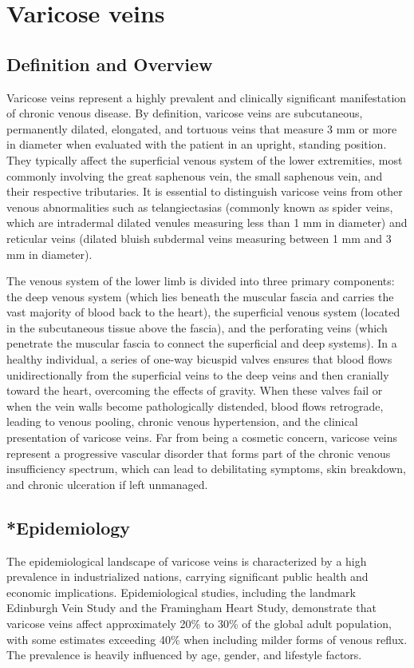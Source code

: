\chapter{Varicose veins}

\section*{Definition and Overview}
Varicose veins represent a highly prevalent and clinically significant manifestation of chronic venous disease. By definition, varicose veins are subcutaneous, permanently dilated, elongated, and tortuous veins that measure 3 mm or more in diameter when evaluated with the patient in an upright, standing position. They typically affect the superficial venous system of the lower extremities, most commonly involving the great saphenous vein, the small saphenous vein, and their respective tributaries. It is essential to distinguish varicose veins from other venous abnormalities such as telangiectasias (commonly known as spider veins, which are intradermal dilated venules measuring less than 1 mm in diameter) and reticular veins (dilated bluish subdermal veins measuring between 1 mm and 3 mm in diameter).

The venous system of the lower limb is divided into three primary components: the deep venous system (which lies beneath the muscular fascia and carries the vast majority of blood back to the heart), the superficial venous system (located in the subcutaneous tissue above the fascia), and the perforating veins (which penetrate the muscular fascia to connect the superficial and deep systems). In a healthy individual, a series of one-way bicuspid valves ensures that blood flows unidirectionally from the superficial veins to the deep veins and then cranially toward the heart, overcoming the effects of gravity. When these valves fail or when the vein walls become pathologically distended, blood flows retrograde, leading to venous pooling, chronic venous hypertension, and the clinical presentation of varicose veins. Far from being a cosmetic concern, varicose veins represent a progressive vascular disorder that forms part of the chronic venous insufficiency spectrum, which can lead to debilitating symptoms, skin breakdown, and chronic ulceration if left unmanaged.

\section{*{Epidemiology}}
The epidemiological landscape of varicose veins is characterized by a high prevalence in industrialized nations, carrying significant public health and economic implications. Epidemiological studies, including the landmark Edinburgh Vein Study and the Framingham Heart Study, demonstrate that varicose veins affect approximately 20\% to 30\% of the global adult population, with some estimates exceeding 40\% when including milder forms of venous reflux. The prevalence is heavily influenced by age, gender, and lifestyle factors.

